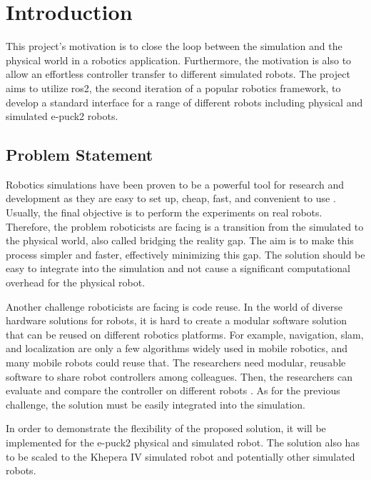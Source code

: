 \chapter{Introduction}
\label{chap:introduction}

This project's motivation is to close the loop between the simulation and the physical world in a robotics application.
Furthermore, the motivation is also to allow an effortless controller transfer to different simulated robots.
The project aims to utilize \ac{ros2}, the second iteration of a popular robotics framework, to develop a standard interface for a range of different robots including physical and simulated e-puck2 robots.

\section{Problem Statement}
Robotics simulations have been proven to be a powerful tool for research and development as they are easy to set up, cheap, fast, and convenient to use \cite{michel_cyberbotics_2004}.
Usually, the final objective is to perform the experiments on real robots.
Therefore, the problem roboticists are facing is a transition from the simulated to the physical world, also called bridging the reality gap.
The aim is to make this process simpler and faster, effectively minimizing this gap. 
The solution should be easy to integrate into the simulation and not cause a significant computational overhead for the physical robot.

Another challenge roboticists are facing is code reuse. 
In the world of diverse hardware solutions for robots, it is hard to create a modular software solution that can be reused on different robotics platforms.
For example, navigation, \ac{slam}, and localization are only a few algorithms widely used in mobile robotics, and many mobile robots could reuse that.
The researchers need modular, reusable software to share robot controllers among colleagues.
Then, the researchers can evaluate and compare the controller on different robots \cite{vaughan_really_2007}.
As for the previous challenge, the solution must be easily integrated into the simulation.

In order to demonstrate the flexibility of the proposed solution, it will be implemented for the e-puck2 physical and simulated robot.
The solution also has to be scaled to the Khepera IV simulated robot and potentially other simulated robots.

